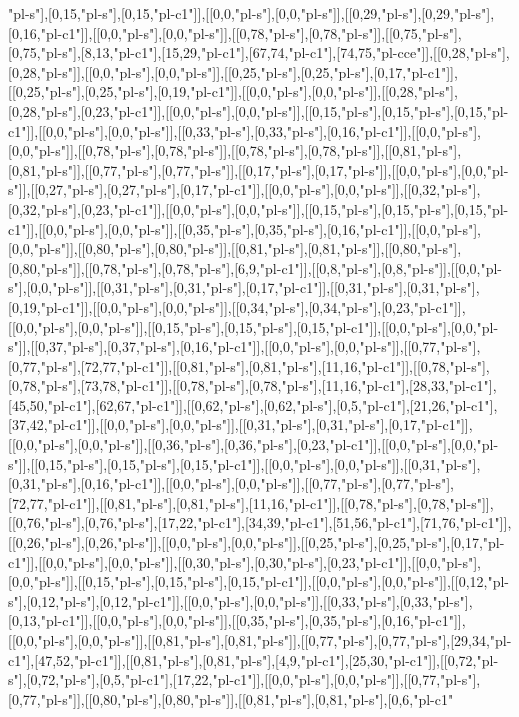 "pl-s"],[0,15,"pl-s"],[0,15,"pl-c1"]],[[0,0,"pl-s"],[0,0,"pl-s"]],[[0,29,"pl-s"],[0,29,"pl-s"],[0,16,"pl-c1"]],[[0,0,"pl-s"],[0,0,"pl-s"]],[[0,78,"pl-s"],[0,78,"pl-s"]],[[0,75,"pl-s"],[0,75,"pl-s"],[8,13,"pl-c1"],[15,29,"pl-c1"],[67,74,"pl-c1"],[74,75,"pl-cce"]],[[0,28,"pl-s"],[0,28,"pl-s"]],[[0,0,"pl-s"],[0,0,"pl-s"]],[[0,25,"pl-s"],[0,25,"pl-s"],[0,17,"pl-c1"]],[[0,25,"pl-s"],[0,25,"pl-s"],[0,19,"pl-c1"]],[[0,0,"pl-s"],[0,0,"pl-s"]],[[0,28,"pl-s"],[0,28,"pl-s"],[0,23,"pl-c1"]],[[0,0,"pl-s"],[0,0,"pl-s"]],[[0,15,"pl-s"],[0,15,"pl-s"],[0,15,"pl-c1"]],[[0,0,"pl-s"],[0,0,"pl-s"]],[[0,33,"pl-s"],[0,33,"pl-s"],[0,16,"pl-c1"]],[[0,0,"pl-s"],[0,0,"pl-s"]],[[0,78,"pl-s"],[0,78,"pl-s"]],[[0,78,"pl-s"],[0,78,"pl-s"]],[[0,81,"pl-s"],[0,81,"pl-s"]],[[0,77,"pl-s"],[0,77,"pl-s"]],[[0,17,"pl-s"],[0,17,"pl-s"]],[[0,0,"pl-s"],[0,0,"pl-s"]],[[0,27,"pl-s"],[0,27,"pl-s"],[0,17,"pl-c1"]],[[0,0,"pl-s"],[0,0,"pl-s"]],[[0,32,"pl-s"],[0,32,"pl-s"],[0,23,"pl-c1"]],[[0,0,"pl-s"],[0,0,"pl-s"]],[[0,15,"pl-s"],[0,15,"pl-s"],[0,15,"pl-c1"]],[[0,0,"pl-s"],[0,0,"pl-s"]],[[0,35,"pl-s"],[0,35,"pl-s"],[0,16,"pl-c1"]],[[0,0,"pl-s"],[0,0,"pl-s"]],[[0,80,"pl-s"],[0,80,"pl-s"]],[[0,81,"pl-s"],[0,81,"pl-s"]],[[0,80,"pl-s"],[0,80,"pl-s"]],[[0,78,"pl-s"],[0,78,"pl-s"],[6,9,"pl-c1"]],[[0,8,"pl-s"],[0,8,"pl-s"]],[[0,0,"pl-s"],[0,0,"pl-s"]],[[0,31,"pl-s"],[0,31,"pl-s"],[0,17,"pl-c1"]],[[0,31,"pl-s"],[0,31,"pl-s"],[0,19,"pl-c1"]],[[0,0,"pl-s"],[0,0,"pl-s"]],[[0,34,"pl-s"],[0,34,"pl-s"],[0,23,"pl-c1"]],[[0,0,"pl-s"],[0,0,"pl-s"]],[[0,15,"pl-s"],[0,15,"pl-s"],[0,15,"pl-c1"]],[[0,0,"pl-s"],[0,0,"pl-s"]],[[0,37,"pl-s"],[0,37,"pl-s"],[0,16,"pl-c1"]],[[0,0,"pl-s"],[0,0,"pl-s"]],[[0,77,"pl-s"],[0,77,"pl-s"],[72,77,"pl-c1"]],[[0,81,"pl-s"],[0,81,"pl-s"],[11,16,"pl-c1"]],[[0,78,"pl-s"],[0,78,"pl-s"],[73,78,"pl-c1"]],[[0,78,"pl-s"],[0,78,"pl-s"],[11,16,"pl-c1"],[28,33,"pl-c1"],[45,50,"pl-c1"],[62,67,"pl-c1"]],[[0,62,"pl-s"],[0,62,"pl-s"],[0,5,"pl-c1"],[21,26,"pl-c1"],[37,42,"pl-c1"]],[[0,0,"pl-s"],[0,0,"pl-s"]],[[0,31,"pl-s"],[0,31,"pl-s"],[0,17,"pl-c1"]],[[0,0,"pl-s"],[0,0,"pl-s"]],[[0,36,"pl-s"],[0,36,"pl-s"],[0,23,"pl-c1"]],[[0,0,"pl-s"],[0,0,"pl-s"]],[[0,15,"pl-s"],[0,15,"pl-s"],[0,15,"pl-c1"]],[[0,0,"pl-s"],[0,0,"pl-s"]],[[0,31,"pl-s"],[0,31,"pl-s"],[0,16,"pl-c1"]],[[0,0,"pl-s"],[0,0,"pl-s"]],[[0,77,"pl-s"],[0,77,"pl-s"],[72,77,"pl-c1"]],[[0,81,"pl-s"],[0,81,"pl-s"],[11,16,"pl-c1"]],[[0,78,"pl-s"],[0,78,"pl-s"]],[[0,76,"pl-s"],[0,76,"pl-s"],[17,22,"pl-c1"],[34,39,"pl-c1"],[51,56,"pl-c1"],[71,76,"pl-c1"]],[[0,26,"pl-s"],[0,26,"pl-s"]],[[0,0,"pl-s"],[0,0,"pl-s"]],[[0,25,"pl-s"],[0,25,"pl-s"],[0,17,"pl-c1"]],[[0,0,"pl-s"],[0,0,"pl-s"]],[[0,30,"pl-s"],[0,30,"pl-s"],[0,23,"pl-c1"]],[[0,0,"pl-s"],[0,0,"pl-s"]],[[0,15,"pl-s"],[0,15,"pl-s"],[0,15,"pl-c1"]],[[0,0,"pl-s"],[0,0,"pl-s"]],[[0,12,"pl-s"],[0,12,"pl-s"],[0,12,"pl-c1"]],[[0,0,"pl-s"],[0,0,"pl-s"]],[[0,33,"pl-s"],[0,33,"pl-s"],[0,13,"pl-c1"]],[[0,0,"pl-s"],[0,0,"pl-s"]],[[0,35,"pl-s"],[0,35,"pl-s"],[0,16,"pl-c1"]],[[0,0,"pl-s"],[0,0,"pl-s"]],[[0,81,"pl-s"],[0,81,"pl-s"]],[[0,77,"pl-s"],[0,77,"pl-s"],[29,34,"pl-c1"],[47,52,"pl-c1"]],[[0,81,"pl-s"],[0,81,"pl-s"],[4,9,"pl-c1"],[25,30,"pl-c1"]],[[0,72,"pl-s"],[0,72,"pl-s"],[0,5,"pl-c1"],[17,22,"pl-c1"]],[[0,0,"pl-s"],[0,0,"pl-s"]],[[0,77,"pl-s"],[0,77,"pl-s"]],[[0,80,"pl-s"],[0,80,"pl-s"]],[[0,81,"pl-s"],[0,81,"pl-s"],[0,6,"pl-c1"